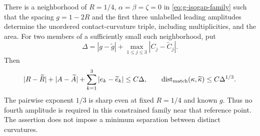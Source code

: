 \begin{theorem}
\label{thm:v6-three}
There is a neighborhood of $R=1/4$, $\alpha=\beta=\zeta=0$ in
\eqref{eq:g-isogap-family} such that the spacing $g=1-2R$ and the
first three unlabelled leading amplitudes determine the unordered
contact-curvature triple, including multiplicities, and the area.
For two members of a sufficiently small such neighborhood, put
\[
 \Delta=|g-\widetilde g|+
                   \max_{1\le j\le3}|C_j-\widetilde C_j|.
\]
Then
\begin{equation}\label{eq:v6-three-bound}
 |R-\widetilde R|+|A-\widetilde A|
       +\sum_{k=1}^3|e_k-\widetilde e_k|\le C\Delta,
 \qquad
 \operatorname{dist}_{\rm match}(\kappa,\widetilde\kappa)
                                      \le C\Delta^{1/3}.
\end{equation}
The pairwise exponent $1/3$ is sharp even at fixed $R=1/4$ and known
$g$. Thus no fourth amplitude is required in this constrained family
near that reference point. The assertion does not impose a minimum
separation between distinct curvatures.
\end{theorem}

